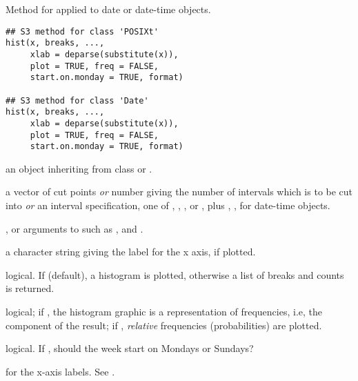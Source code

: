 %
\begin{Description}\relax
Method for  applied to date or date-time objects.
\end{Description}
%
\begin{Usage}
\begin{verbatim}
## S3 method for class 'POSIXt'
hist(x, breaks, ...,
     xlab = deparse(substitute(x)),
     plot = TRUE, freq = FALSE,
     start.on.monday = TRUE, format)

## S3 method for class 'Date'
hist(x, breaks, ...,
     xlab = deparse(substitute(x)),
     plot = TRUE, freq = FALSE,
     start.on.monday = TRUE, format)
\end{verbatim}
\end{Usage}
%
\begin{Arguments}
\begin{ldescription}
\item[\code{x}] an object inheriting from class  or .
\item[\code{breaks}] 
a vector of cut points \emph{or} number giving the number of
intervals which  is to be cut into \emph{or} an
interval specification, one of , ,
,  or ,
plus , ,  for
date-time objects.

\item[\code{...}] , or arguments to
 such as ,
 and .
\item[\code{xlab}] a character string giving the label for the x axis, if plotted.
\item[\code{plot}] logical.  If  (default), a histogram is
plotted, otherwise a list of breaks and counts is returned.
\item[\code{freq}] logical; if , the
histogram graphic is a representation of frequencies, i.e,
the  component of the result; if ,
\emph{relative} frequencies (probabilities) are plotted.
\item[\code{start.on.monday}] logical. If , should the
week start on Mondays or Sundays?
\item[\code{format}] for the x-axis labels. See .
\end{ldescription}
\end{Arguments}
